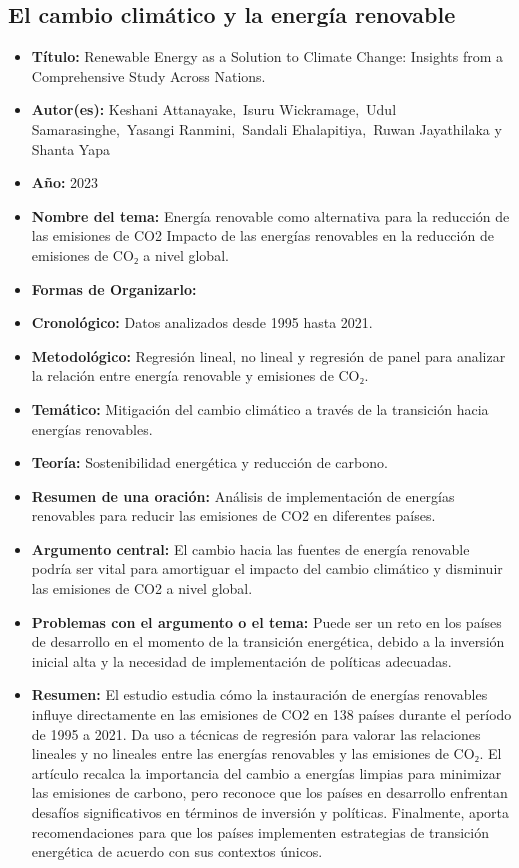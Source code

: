 \documentclass[
  letterpaper,
  DIV=11,
  numbers=noendperiod]{scrreprt}
\begin{document}
\subsection{El cambio climático y la energía
renovable}\label{el-cambio-climuxe1tico-y-la-energuxeda-renovable}

\begin{itemize}
\item
  \textbf{Título:} Renewable Energy as a Solution to Climate Change:
  Insights from a Comprehensive Study Across Nations.
\item
  \textbf{Autor(es):} Keshani Attanayake,~Isuru Wickramage,~Udul
  Samarasinghe,~Yasangi Ranmini,~Sandali Ehalapitiya,~Ruwan Jayathilaka
  y Shanta Yapa
\item
  \textbf{Año:} 2023
\item
  \textbf{Nombre del tema:} Energía renovable como alternativa para la
  reducción de las emisiones de CO2 Impacto de las energías renovables
  en la reducción de emisiones de CO₂ a nivel global.
\item
  \textbf{Formas de Organizarlo:}
\item
  \textbf{Cronológico:} Datos analizados desde 1995 hasta 2021.
\item
  \textbf{Metodológico:} Regresión lineal, no lineal y regresión de
  panel para analizar la relación entre energía renovable y emisiones de
  CO₂.
\item
  \textbf{Temático:} Mitigación del cambio climático a través de la
  transición hacia energías renovables.
\item
  \textbf{Teoría:} Sostenibilidad energética y reducción de carbono.
\item
  \textbf{Resumen de una oración:} Análisis de implementación de
  energías renovables para reducir las emisiones de CO2 en diferentes
  países.
\item
  \textbf{Argumento central:} El cambio hacia las fuentes de energía
  renovable podría ser vital para amortiguar el impacto del cambio
  climático y disminuir las emisiones de CO2 a nivel global.
\item
  \textbf{Problemas con el argumento o el tema:} Puede ser un reto en
  los países de desarrollo en el momento de la transición energética,
  debido a la inversión inicial alta y la necesidad de implementación de
  políticas adecuadas.
\item
  \textbf{Resumen:} El estudio estudia cómo la instauración de energías
  renovables influye directamente en las emisiones de CO2 en 138 países
  durante el período de 1995 a 2021. Da uso a técnicas de regresión para
  valorar las relaciones lineales y no lineales entre las energías
  renovables y las emisiones de CO₂. El artículo recalca la importancia
  del cambio a energías limpias para minimizar las emisiones de carbono,
  pero reconoce que los países en desarrollo enfrentan desafíos
  significativos en términos de inversión y políticas. Finalmente,
  aporta recomendaciones para que los países implementen estrategias de
  transición energética de acuerdo con sus contextos únicos.
\end{itemize}
\end{document}
